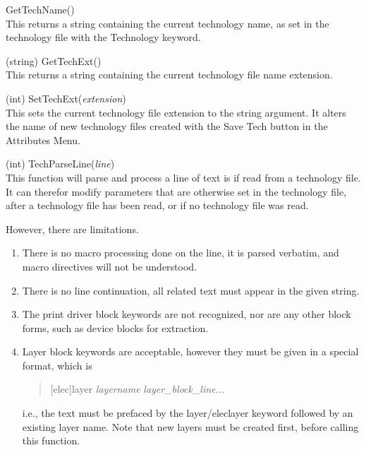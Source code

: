 \begin{description}
\item{\vt GetTechName()}\\
This returns a string containing the current technology name, as set
in the technology file with the {\vt Technology} keyword.

\item{(string) \vt GetTechExt()}\\
This returns a string containing the current technology file name
extension.

\item{(int) \vt SetTechExt({\it extension})}\\
This sets the current technology file extension to the string
argument.  It alters the name of new technology files created with the
{\cb Save Tech} button in the {\cb Attributes Menu}.

\item{(int) \vt TechParseLine({\it line})}\\
This function will parse and process a line of text is if read from a
technology file.  It can therefor modify parameters that are otherwise
set in the technology file, after a technology file has been read, or
if no technology file was read.
  
However, there are limitations.
\begin{enumerate}
\item{There is no macro processing done on the line, it is parsed
verbatim, and macro directives will not be understood.}

\item{There is no line continuation, all related text must appear in
the given string.}

\item{The print driver block keywords are not recognized, nor are any
other block forms, such as device blocks for extraction.}

\item{Layer block keywords are acceptable, however they must be given
in a special format, which is
\begin{quote}
  [{\vt elec}]{\vt layer} {\it layername} {\it layer\_block\_line...}
\end{quote}
i.e., the text must be prefaced by the {\vt layer}/{\vt eleclayer}
keyword followed by an existing layer name.  Note that new layers must
be created first, before calling this function.}
\end{enumerate}


\end{description}
